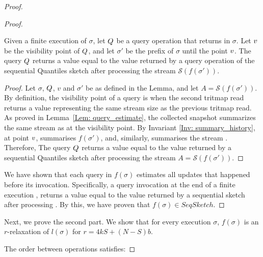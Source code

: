 \begin{proof}
\begin{proof}
\begin{lemma} \label{Lem: query_correctness}
Given a finite execution of \mysketch $\sigma$, let $\mathnormal{Q}$ be a query operation that returns in $\sigma$. Let $\mathnormal{v}$ be the visibility point of $\mathnormal{Q}$, and let $\sigma'$ be the prefix of $\sigma$ until the point $\mathnormal{v}$. The query $\mathnormal{Q}$ returns a value equal to the value returned by a query operation of the sequential Quantiles sketch after processing the stream $\mathcal{S}\left(f(\sigma')\right)$.

\end{lemma}
\begin{proof}
Let $\sigma$, $\mathnormal{Q}$, $v$ and $\sigma'$ be as defined in the Lemma,
and let \(A=\mathcal{S}(f(\sigma'))\).
By definition, the visibility point of a query is when the second tritmap read returns a value representing the same stream size as the previous tritmap read. As proved in Lemma~\ref{Lem: query_estimate}, the collected snapshot summarizes the same stream as \mysketch at the visibility point. By Invariant \ref{Inv: summary_history}, at point $\mathnormal{v}$, \mysketch summarises $f(\sigma')$, and, similarly, summarises the stream \A. 
Therefore, The query $\mathnormal{Q}$ returns a value equal to the value returned by a sequential Quantiles sketch after processing the stream \(A=\mathcal{S}(f(\sigma'))\).
\end{proof}

We have shown that each query in $f(\sigma)$ estimates all updates that happened before its invocation. Specifically, a query invocation at the end of a finite execution \s,
returns a value equal to the value returned by a sequential sketch after processing
\A. By this, we have proven that $ f(\sigma) \in SeqSketch$.
\end{proof}

Next, we prove the second part. We show that for every execution $\sigma$, $f(\sigma)$  is an \(r\)-relaxation of \(l(\sigma)\) for \(r = 4kS + (N-S)b\).

The order between operations satisfies:


\end{proof}
